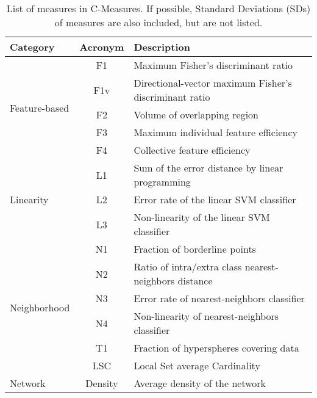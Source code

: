 \begin{table}[t!]
    \footnotesize
    \centering
    \caption{List of measures in C-Measures. If possible, Standard Deviations (SDs) of measures are also included, but are not listed.}
    \begin{tabular}{l|c|p{5cm}}
    \toprule
    Category & Acronym & Description \\ 
    \midrule
    \multirow{5}{*}{Feature-based}   & F1     & Maximum Fisher’s discriminant ratio                        \\
                                     & F1v     & Directional-vector maximum Fisher’s discriminant ratio    \\
                                     & F2     & Volume of overlapping region                               \\
                                     & F3     & Maximum individual feature efficiency                      \\
                                     & F4     & Collective feature efficiency                              \\ 
    \midrule
    \multirow{3}{*}{Linearity}       & L1     & Sum of the error distance by linear programming            \\
                                     & L2     & Error rate of the linear SVM classifier                    \\
                                     & L3     & Non-linearity of the linear SVM classifier                 \\
    \midrule
    \multirow{6}{*}{Neighborhood}    & N1     & Fraction of borderline points                              \\
                                     & N2     & Ratio of intra/extra class nearest-neighbors distance      \\
                                     & N3     & Error rate of nearest-neighbors classifier                 \\
                                     & N4     & Non-linearity of nearest-neighbors classifier              \\
                                     & T1     & Fraction of hyperspheres covering data                     \\
                                     & LSC     & Local Set average Cardinality                             \\
    \midrule
    \multirow{3}{*}{Network}         & Density     & Average density of the network                        \\

\end{tabular}
\end{table}
